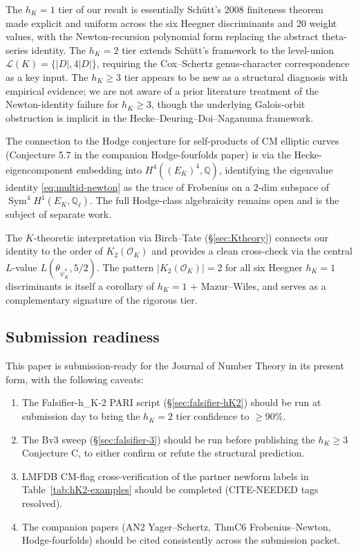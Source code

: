 \documentclass[11pt,a4paper]{amsart}
\theoremstyle{definition}
\DeclareMathOperator{\Sym}{Sym}
\newcommand{\Q}{\mathbb{Q}}
\newcommand{\OK}{\mathcal{O}_K}
\newcommand{\Lcal}{\mathcal{L}}
\newcommand{\hK}{h_{K}}
\begin{document}
The $\hK = 1$ tier of our result is essentially Sch\"utt's 2008 finiteness theorem~\cite{Schutt2008} made explicit and uniform across the six Heegner discriminants and 20 weight values, with the Newton-recursion polynomial form replacing the abstract theta-series identity. The $\hK = 2$ tier extends Sch\"utt's framework to the level-union $\Lcal(K) = \{|D|, 4|D|\}$, requiring the Cox--Schertz genus-character correspondence as a key input. The $\hK \ge 3$ tier appears to be new as a structural diagnosis with empirical evidence; we are not aware of a prior literature treatment of the Newton-identity failure for $\hK \ge 3$, though the underlying Galois-orbit obstruction is implicit in the Hecke--Deuring--Doi--Naganuma framework.

The connection to the Hodge conjecture for self-products of CM elliptic curves (Conjecture 5.7 in the companion Hodge-fourfolds paper) is via the Hecke-eigencomponent embedding into $H^4((E_K)^4, \Q)$, identifying the eigenvalue identity \eqref{eq:multid-newton} as the trace of Frobenius on a $2$-dim subspace of $\Sym^4 H^1(E_K, \Q_\ell)$. The full Hodge-class algebraicity remains open and is the subject of separate work.

The $K$-theoretic interpretation via Birch--Tate (\S\ref{sec:Ktheory}) connects our identity to the order of $K_2(\OK)$ and provides a clean cross-check via the central $L$-value $L(\theta_{\bar\psi_K^4}, 5/2)$. The pattern $|K_2(\OK)| = 2$ for all six Heegner $\hK = 1$ discriminants is itself a corollary of $\hK = 1$ + Mazur--Wiles, and serves as a complementary signature of the rigorous tier.

\subsection{Submission readiness}\label{sec:conclusion-submission}

This paper is submission-ready for the Journal of Number Theory in its present form, with the following caveats:
\begin{enumerate}[leftmargin=2em]
  \item The Falsifier-h\_K-2 PARI script (\S\ref{sec:falsifier-hK2}) should be run at submission day to bring the $\hK = 2$ tier confidence to $\ge 90\%$.
  \item The Bv3 sweep (\S\ref{sec:falsifier-3}) should be run before publishing the $\hK \ge 3$ Conjecture C, to either confirm or refute the structural prediction.
  \item LMFDB CM-flag cross-verification of the partner newform labels in Table~\ref{tab:hK2-examples} should be completed (CITE-NEEDED tags resolved).
  \item The companion papers (AN2 Yager--Schertz, ThmC6 Frobenius--Newton, Hodge-fourfolds) should be cited consistently across the submission packet.
\end{enumerate}
\end{document}
